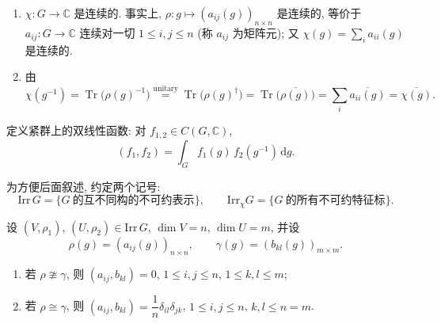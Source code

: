 \begin{remark}\label{rem:character-continuous}
\mbox{}\par\vspace{-0.2em}
\begin{enumerate}
  \item $\chi\colon G\to\mathbb{C}$ 是连续的. 事实上, $\rho\colon g\mapsto(a_{ij}(g))_{n\times n}$
  是连续的, 等价于 $a_{ij}\colon G\to\mathbb{C}$ 连续对一切 $1\le i,j\le n$
  (称 $a_{ij}$ 为矩阵元); 又 $\chi(g)=\sum_i a_{ii}(g)$ 是连续的.
  \item 由
  \[
    \chi(g^{-1})=\operatorname{Tr}\bigl(\rho(g)^{-1}\bigr)
    \overset{\text{unitary}}{=}\operatorname{Tr}\bigl(\rho(g)^{\dagger}\bigr)
    =\operatorname{Tr}\bigl(\overline{\rho(g)}\bigr)=\sum_{i}\overline{a_{ii}(g)}
    =\overline{\chi(g)} .
  \]
\end{enumerate}
\end{remark}

\begin{definition}\label{def:compact-bilinear}
定义紧群上的双线性函数: 对 $f_{1,2}\in C(G,\mathbb{C})$,
\[
  (f_1,f_2)=\int_G f_1(g)\,f_2(g^{-1})\,\mathrm{d}g .
\]
\end{definition}

为方便后面叙述, 约定两个记号:
\[
  \mathrm{Irr}\,G=\{G\ \text{的互不同构的不可约表示}\},\qquad
  \mathrm{Irr}_\chi G=\{G\ \text{的所有不可约特征标}\}.
\]

\begin{theorem}[正交关系]\label{thm:compact-orthogonality}
设 $(V,\rho_1)$, $(U,\rho_2)\in\mathrm{Irr}\,G$, $\dim V=n$, $\dim U=m$, 并设
\[
  \rho(g)=(a_{ij}(g))_{n\times n},\qquad \gamma(g)=(b_{kl}(g))_{m\times m}.
\]
\begin{enumerate}
  \item 若 $\rho\ncong\gamma$, 则 $(a_{ij},b_{kl})=0$, $1\le i,j\le n$, $1\le k,l\le m$;
  \item 若 $\rho\cong\gamma$, 则 $(a_{ij},b_{kl})=\dfrac{1}{n}\delta_{il}\delta_{jk}$,
        $1\le i,j\le n$, $k,l\le n=m$.
\end{enumerate}
\end{theorem}

